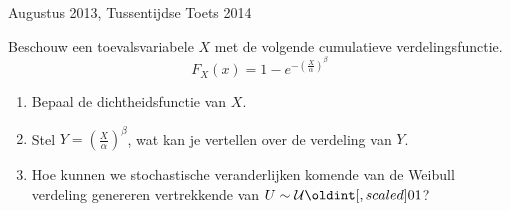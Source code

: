 \documentclass[main.tex]{subfiles}
\begin{document}
\begin{examenvraag}{Augustus 2013, Tussentijdse Toets 2014}
  \begin{ex-vraag}
    Beschouw een toevalsvariabele $X$ met de volgende cumulatieve verdelingsfunctie.
    \[ F_{X}(x) = 1 - e^{-\left(\frac{X}{\alpha}\right)^{\beta}} \]
    \begin{enumerate}
    \item Bepaal de dichtheidsfunctie van $X$.
    \item Stel $Y=\left(\frac{X}{\alpha}\right)^{\beta}$, wat kan je vertellen over de verdeling van $Y$.
    \item Hoe kunnen we stochastische veranderlijken komende van de Weibull verdeling genereren vertrekkende van $U \sim \mathcal{U}\interval{0}{1}$?
    \end{enumerate}
  \end{ex-vraag}
  

\end{examenvraag}
\end{document}
